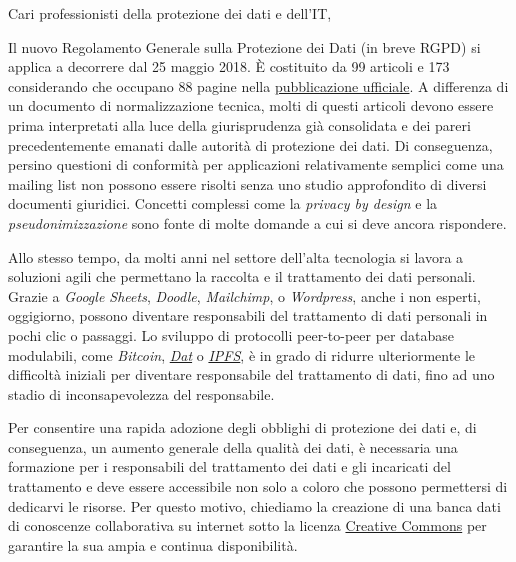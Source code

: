 \documentclass{scrlttr2}
\begin{document}



\begin{letter}{}
\opening{Cari professionisti della protezione dei dati e dell'IT,}

Il nuovo Regolamento Generale sulla Protezione dei Dati (in breve RGPD)
si applica a decorrere dal 25 maggio 2018. È costituito da 99 articoli e
173 considerando che occupano 88 pagine nella
\href{http://eur-lex.europa.eu/legal-content/EN/TXT/?uri=uriserv:OJ.L_.2016.119.01.0001.01.ENG}{pubblicazione
ufficiale}. A differenza di un documento di normalizzazione tecnica,
molti di questi articoli devono essere prima interpretati alla luce
della giurisprudenza già consolidata e dei pareri precedentemente
emanati dalle autorità di protezione dei dati. Di conseguenza, persino
questioni di conformità per applicazioni relativamente semplici come una
mailing list non possono essere risolti senza uno studio approfondito di
diversi documenti giuridici. Concetti complessi come la \emph{privacy by
design} e la \emph{pseudonimizzazione} sono fonte di molte domande a cui
si deve ancora rispondere.

Allo stesso tempo, da molti anni nel settore dell'alta tecnologia si
lavora a soluzioni agili che permettano la raccolta e il trattamento dei
dati personali. Grazie a \emph{Google Sheets}, \emph{Doodle},
\emph{Mailchimp}, o \emph{Wordpress}, anche i non esperti, oggigiorno,
possono diventare responsabili del trattamento di dati personali in
pochi clic o passaggi. Lo sviluppo di protocolli peer-to-peer per
database modulabili, come \emph{Bitcoin},
\emph{\href{https://datproject.org/}{Dat}} o
\emph{\href{https://ipfs.io/}{IPFS}}, è in grado di ridurre
ulteriormente le difficoltà iniziali per diventare responsabile del
trattamento di dati, fino ad uno stadio di inconsapevolezza del
responsabile.

Per consentire una rapida adozione degli obblighi di protezione dei dati
e, di conseguenza, un aumento generale della qualità dei dati, è
necessaria una formazione per i responsabili del trattamento dei dati e
gli incaricati del trattamento e deve essere accessibile non solo a
coloro che possono permettersi di dedicarvi le risorse. Per questo
motivo, chiediamo la creazione di una banca dati di conoscenze
collaborativa su internet sotto la licenza
\href{https://creativecommons.org/}{Creative Commons} per garantire la
sua ampia e continua disponibilità.


\end{letter}
\end{document}
